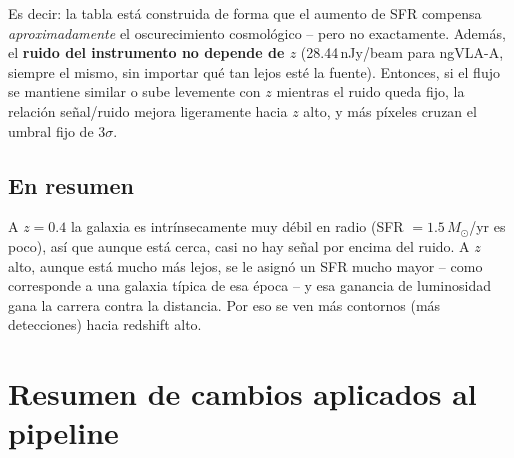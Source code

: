 \documentclass[12pt, a4paper]{article}
\begin{document}
Es decir: la tabla está construida de forma que el aumento de SFR compensa
\textit{aproximadamente} el oscurecimiento cosmológico -- pero no
exactamente. Además, el \textbf{ruido del instrumento no depende de $z$}
(28.44\,nJy/beam para ngVLA-A, siempre el mismo, sin importar qué tan lejos
esté la fuente). Entonces, si el flujo se mantiene similar o sube levemente
con $z$ mientras el ruido queda fijo, la relación señal/ruido mejora
ligeramente hacia $z$ alto, y más píxeles cruzan el umbral fijo de
$3\sigma$.

\subsection{En resumen}

A $z=0.4$ la galaxia es intrínsecamente muy débil en radio (SFR $=1.5\,
M_\odot$/yr es poco), así que aunque está cerca, casi no hay señal por
encima del ruido. A $z$ alto, aunque está mucho más lejos, se le asignó un
SFR mucho mayor -- como corresponde a una galaxia típica de esa época -- y
esa ganancia de luminosidad gana la carrera contra la distancia. Por eso se
ven más contornos (más detecciones) hacia redshift alto.

\section{Resumen de cambios aplicados al pipeline}
\end{document}
